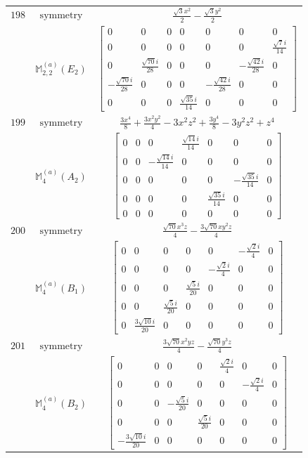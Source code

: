 \documentclass[fleqn,8pt,landscape]{jsarticle}
\begin{document}
\begin{longtable}{ccc}
$ 198 $ & $ \text{symmetry} $ & $ \frac{\sqrt{3} x^{2}}{2} - \frac{\sqrt{3} y^{2}}{2} $ \\
$  $ & $ \mathbb{M}_{2,2}^{(a)}(E_{2}) $ & $ \begin{bmatrix} 0 & 0 & 0 & 0 & 0 & 0 & 0 \\ 0 & 0 & 0 & 0 & 0 & 0 & \frac{\sqrt{7} i}{14} \\ 0 & \frac{\sqrt{70} i}{28} & 0 & 0 & 0 & - \frac{\sqrt{42} i}{28} & 0 \\ - \frac{\sqrt{70} i}{28} & 0 & 0 & 0 & - \frac{\sqrt{42} i}{28} & 0 & 0 \\ 0 & 0 & 0 & \frac{\sqrt{35} i}{14} & 0 & 0 & 0 \end{bmatrix} $ \\ \hline
$ 199 $ & $ \text{symmetry} $ & $ \frac{3 x^{4}}{8} + \frac{3 x^{2} y^{2}}{4} - 3 x^{2} z^{2} + \frac{3 y^{4}}{8} - 3 y^{2} z^{2} + z^{4} $ \\
$  $ & $ \mathbb{M}_{4}^{(a)}(A_{2}) $ & $ \begin{bmatrix} 0 & 0 & 0 & \frac{\sqrt{14} i}{14} & 0 & 0 & 0 \\ 0 & 0 & - \frac{\sqrt{14} i}{14} & 0 & 0 & 0 & 0 \\ 0 & 0 & 0 & 0 & 0 & - \frac{\sqrt{35} i}{14} & 0 \\ 0 & 0 & 0 & 0 & \frac{\sqrt{35} i}{14} & 0 & 0 \\ 0 & 0 & 0 & 0 & 0 & 0 & 0 \end{bmatrix} $ \\ \hline
$ 200 $ & $ \text{symmetry} $ & $ \frac{\sqrt{70} x^{3} z}{4} - \frac{3 \sqrt{70} x y^{2} z}{4} $ \\
$  $ & $ \mathbb{M}_{4}^{(a)}(B_{1}) $ & $ \begin{bmatrix} 0 & 0 & 0 & 0 & 0 & - \frac{\sqrt{2} i}{4} & 0 \\ 0 & 0 & 0 & 0 & - \frac{\sqrt{2} i}{4} & 0 & 0 \\ 0 & 0 & 0 & \frac{\sqrt{5} i}{20} & 0 & 0 & 0 \\ 0 & 0 & \frac{\sqrt{5} i}{20} & 0 & 0 & 0 & 0 \\ 0 & \frac{3 \sqrt{10} i}{20} & 0 & 0 & 0 & 0 & 0 \end{bmatrix} $ \\ \hline
$ 201 $ & $ \text{symmetry} $ & $ \frac{3 \sqrt{70} x^{2} y z}{4} - \frac{\sqrt{70} y^{3} z}{4} $ \\
$  $ & $ \mathbb{M}_{4}^{(a)}(B_{2}) $ & $ \begin{bmatrix} 0 & 0 & 0 & 0 & \frac{\sqrt{2} i}{4} & 0 & 0 \\ 0 & 0 & 0 & 0 & 0 & - \frac{\sqrt{2} i}{4} & 0 \\ 0 & 0 & - \frac{\sqrt{5} i}{20} & 0 & 0 & 0 & 0 \\ 0 & 0 & 0 & \frac{\sqrt{5} i}{20} & 0 & 0 & 0 \\ - \frac{3 \sqrt{10} i}{20} & 0 & 0 & 0 & 0 & 0 & 0 \end{bmatrix} $ \\ \hline

\end{longtable}
\end{document}
